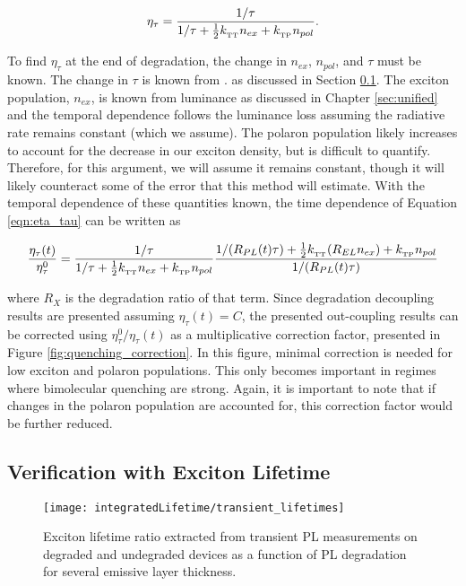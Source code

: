 \documentclass[../thesis.tex]{subfiles}
\begin{document}
\begin{equation}
\eta_\tau=\frac{1/\tau}{1/\tau+\frac{1}{2}k_{_\text{\tiny TT}} n_{ex} +k_{_\text{\tiny TP}} n_{pol}}.
\label{eqn:eta_tau}
\end{equation}

To find $\eta_\tau$ at the end of degradation, the change in $n_{ex}$, $n_{pol}$, and $\tau$ must be known.  
The change in $\tau$ is known from \pl. as discussed in Section \ref{sec:lifetime_pl_transients}.
The exciton population, $n_{ex}$, is known from luminance as discussed in Chapter \ref{sec:unified} and the temporal dependence follows the luminance loss assuming the radiative rate remains constant (which we assume).
The polaron population likely increases to account for the decrease in our exciton density, but is difficult to quantify.
Therefore, for this argument, we will assume it remains constant, though it will likely counteract some of the error that this method will estimate.
With the temporal dependence of these quantities known, the time dependence of Equation \ref{eqn:eta_tau} can be written as


\begin{equation}
\frac{\eta_\tau(t)}{\eta_\tau^0}=\frac{1/\tau}{1/\tau+\frac{1}{2}k_{_\text{\tiny TT}} n_{ex} +k_{_\text{\tiny TP}} n_{pol}}  \frac{1/(R_{PL}(t)\tau)+\frac{1}{2}k_{_\text{\tiny TT}} (R_{EL}n_{ex}) +k_{_\text{\tiny TP}} n_{pol}}{1/(R_{PL}(t)\tau)}
\label{eqn:eta_tau_deg}
\end{equation}

where $R_X$ is the degradation ratio of that term.  
Since degradation decoupling results are presented assuming $\eta_\tau(t)=C$, the presented out-coupling results can be corrected using $\eta_\tau^0/\eta_\tau(t)$ as a multiplicative correction factor, presented in Figure \ref{fig:quenching_correction}.
In this figure, minimal correction is needed for low exciton and polaron populations.  
This only becomes important in regimes where bimolecular quenching are strong.
Again, it is important to note that if changes in the polaron population are accounted for, this correction factor would be further reduced.

\subsection{Verification with Exciton Lifetime}\label{sec:lifetime_pl_transients}
\begin{wrapfigure}{r}{.5\textwidth}
\centering
\texttt{[image: integratedLifetime/transient\_lifetimes]}
\caption{Exciton lifetime ratio extracted from transient PL measurements on degraded and undegraded devices as a function of PL degradation for several emissive layer thickness.}
\label{fig:transient_lifetimes}
\end{wrapfigure}
\end{document}
